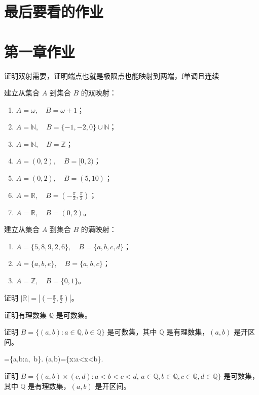 \chapter{最后要看的作业}


\chapter{第一章作业}
\begin{dxtips}
  证明双射需要，证明端点也就是极限点也能映射到两端，f单调且连续  
\end{dxtips}
\begin{homework}[1.1]
建立从集合 $A$ 到集合 $B$ 的双映射：
\begin{enumerate}
  \item $A = \omega, \quad B = \omega + 1$；
  \item $A = \mathbb{N}, \quad B = \{-1,-2,0\} \cup \mathbb{N}$；
  \item $A = \mathbb{N}, \quad B = \mathbb{Z}$；
  \item $A = (0,2), \quad B = [0,2)$；
  \item $A = (0,2), \quad B = (5,10)$；
  \item $A = \mathbb{R}, \quad B = \left(-\tfrac{\pi}{2}, \tfrac{\pi}{2}\right)$；
  \item $A = \mathbb{R}, \quad B = (0,2)$。
\end{enumerate}
\end{homework}

\begin{homework}[1.2]
建立从集合 $A$ 到集合 $B$ 的满映射：
\begin{enumerate}
  \item $A = \{5,8,9,2,6\}, \quad B = \{a,b,c,d\}$；
  \item $A = \{a,b,e\}, \quad B = \{a,b,c\}$；
  \item $A = \mathbb{Z}, \quad B = \{0,1\}$。
\end{enumerate}
\end{homework}

\begin{homework}[1.3]
证明 $|\mathbb{R}| = |(-\tfrac{\pi}{2}, \tfrac{\pi}{2})|$。
\end{homework}

\begin{homework}[1.14]
证明有理数集 $\mathbb{Q}$ 是可数集。
\end{homework}

\begin{homework}[1.15]
证明 $B=\{(a,b): a\in \mathbb{Q}, b\in \mathbb{Q}\}$ 是可数集，其中 $\mathbb{Q}$ 是有理数集，$(a,b)$ 是开区间。
\end{homework}
\begin{dxtips}
    \times{}=\{\langle a,b\rangle:a\in{},\ b\in{}\}. \quad (a,b)=\{x\in{}:a<x<b\}.
\end{dxtips}
\begin{homework}[1.16]
证明 $B=\{(a,b)\times (c,d): a<b<c<d,\, a\in \mathbb{Q}, b\in \mathbb{Q}, c\in \mathbb{Q}, d\in \mathbb{Q}\}$ 是可数集，其中 $\mathbb{Q}$ 是有理数集，$(a,b)$ 是开区间。
\end{homework}

